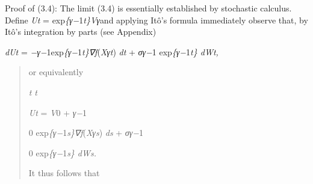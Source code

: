 \documentclass[
]{article}
\begin{document}
\begin{longtable}[]
{\begin{minipage}[b]{\linewidth}
{{\begin{minipage}[t]{\linewidth}
{\begin{minipage}[t]{\linewidth}
{{{{{{{\begin{minipage}[t]{\linewidth}
{\begin{minipage}[t]{\linewidth}
\begin{longtable}[]
{\begin{minipage}[b]{\linewidth}
\begin{minipage}[t]{\linewidth}
{\begin{minipage}[t]{\linewidth}
{\begin{minipage}[t]{\linewidth}
{\begin{minipage}[t]{\linewidth}
\begin{longtable}[]
{\begin{minipage}[t]{\linewidth}
Proof of (3.4): The limit (3.4) is essentially established by stochastic
calculus. Define \emph{Ut} = exp\emph{\{γ−}1\emph{t\}Vγ}and applying
Itô's formula immediately observe that, by Itô's integration by parts
(see Appendix)

\emph{dUt} = \emph{−γ−}1exp\emph{\{γ−}1\emph{t\}∇f}(\emph{Xγt})
\emph{dt} + \emph{σγ−}1 exp\emph{\{γ−}1\emph{t\} dWt,}

\begin{quote}
or equivalently

\emph{t} \emph{t}

\emph{Ut} = \emph{V}0 + \emph{γ−}1

0 exp\emph{\{γ−}1\emph{s\}∇f}(\emph{Xγs}) \emph{ds} + \emph{σγ−}1

0 exp\emph{\{γ−}1\emph{s\} dWs.}

It thus follows that
\end{quote}


\end{minipage}}
\end{longtable}
\end{minipage}}
\end{minipage}}
\end{minipage}}
\end{minipage}
\end{minipage}}
\end{longtable}
\end{minipage}}
\end{minipage}}}}}}}}
\end{minipage}}
\end{minipage}}}
\end{minipage}}
\end{longtable}
\end{document}
